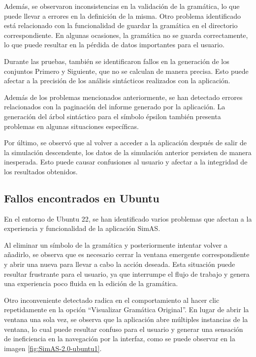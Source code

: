 Además, se observaron inconsistencias en la validación de la gramática, lo que puede llevar a errores en la definición de la misma. Otro problema identificado está relacionado con la funcionalidad de guardar la gramática en el directorio correspondiente. En algunas ocasiones, la gramática no se guarda correctamente, lo que puede resultar en la pérdida de datos importantes para el usuario.

Durante las pruebas, también se identificaron fallos en la generación de los conjuntos Primero y Siguiente, que no se calculan de manera precisa. Esto puede afectar a la precisión de los análisis sintácticos realizados con la aplicación.

Además de los problemas mencionados anteriormente, se han detectado errores relacionados con la paginación del informe generado por la aplicación. La generación del árbol sintáctico para el símbolo épsilon también presenta problemas en algunas situaciones específicas.

Por último, se observó que al volver a acceder a la aplicación después de salir de la simulación descendente, los datos de la simulación anterior persisten de manera inesperada. Esto puede causar confusiones al usuario y afectar a la integridad de los resultados obtenidos.

\subsection{Fallos encontrados en Ubuntu}

En el entorno de Ubuntu 22, se han identificado varios problemas que afectan a la experiencia y funcionalidad de la aplicación SimAS.

Al eliminar un símbolo de la gramática y posteriormente intentar volver a añadirlo, se observa que es necesario cerrar la ventana emergente correspondiente y abrir una nueva para llevar a cabo la acción deseada. Esta situación puede resultar frustrante para el usuario, ya que interrumpe el flujo de trabajo y genera una experiencia poco fluida en la edición de la gramática.

Otro inconveniente detectado radica en el comportamiento al hacer clic repetidamente en la opción ``Visualizar Gramática Original''. En lugar de abrir la ventana una sola vez, se observa que la aplicación abre múltiples instancias de la ventana, lo cual puede resultar confuso para el usuario y generar una sensación de ineficiencia en la navegación por la interfaz, como se puede observar en la imagen \ref{fig:SimAS-2.0-ubuntu1}.

